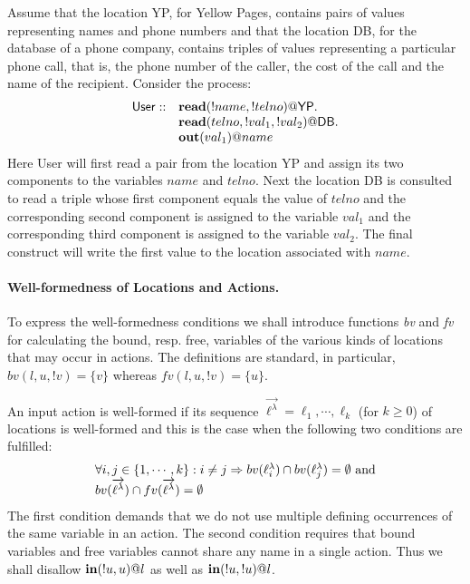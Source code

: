 \documentclass[a4paper]{llncs}
\newcommand{\veck}[1]{\overrightarrow{#1}}
\begin{document}
\begin{example}\label{ex1}
Assume that the location {\sf YP}, for Yellow Pages, contains pairs of
values representing names and phone numbers and that the location {\sf
DB}, for the database of a phone company, contains triples of values
representing a particular phone call, that is, the phone number of the
caller, the cost of the call and the name of the recipient.  Consider
the process:
$$
\begin{array}{ll}
{\sf User} :: & {\bf read}(!name,!telno)@{\sf YP}.\\ 
& {\bf read}(telno,!val_1,!val_2)@{\sf DB}.\\
& {\bf out}(val_1)@{name}\\
\end{array}
$$
Here {\sf User} will first read a pair from the location {\sf YP} and assign its
two components to the variables $name$ and $telno$. Next the location {\sf DB} is 
consulted to read a triple whose first component equals the value of $telno$ and the
corresponding second component is assigned to the variable $val_1$ and the
corresponding third component is assigned to the variable $val_2$. The final construct
will write the first value to the location associated with $name$.
\end{example}


\paragraph{Well-formedness of Locations and Actions.}

To express the well-formedness conditions we shall introduce functions
{\it bv} and {\it fv} for calculating the bound, resp. free, variables
of the various kinds of locations that may occur in actions. The
definitions are standard, in particular, $bv(l,u,!v) = \{v\}$ whereas
$fv(l,u,!v) = \{u\}$.
 
An input action is well-formed if its sequence $\veck{\ell^\lambda} =
\ell_1, \cdots,\ell_k$ (for $k\geq 0$) of locations is well-formed and this is the
case when the following two conditions are fulfilled:
$$
\begin{array}{l}
  \forall i,j \in \{1,\cdots,k\}: i\neq j \Rightarrow 
 bv(\ell_i^\lambda)\cap bv(\ell_j^\lambda)=\emptyset\ \hbox{and} 
\\
  bv(\veck{\ell^\lambda})\cap fv(\veck{\ell^\lambda}) = \emptyset
\end{array}
$$
The first condition demands that we do not use multiple defining
occurrences of the same variable in an action. The second condition
requires that bound variables and free variables cannot share any name
in a single action.  Thus we shall disallow ${\bf
in}(!u,u)@l$ as well as ${\bf in}(!u,!u)@l$.
\end{document}
